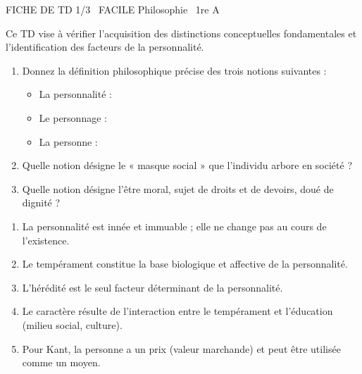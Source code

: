\documentclass[11pt]{article}
\begin{document}
\begin{tcolorbox}[enhanced,colback=popink,colframe=popink,arc=10pt,boxrule=0pt,left=12pt,right=12pt,top=9pt,bottom=9pt]
{\color{white}\popxbold\small FICHE DE TD 1/3 \textbullet\ FACILE \hfill Philosophie \textbullet\ 1re A\par}
\end{tcolorbox}
\vspace{4pt}
Ce TD vise à vérifier l'acquisition des distinctions conceptuelles fondamentales et l'identification des facteurs de la personnalité.

\begin{exercice}
\begin{enumerate}
    \item Donnez la définition philosophique précise des trois notions suivantes :
    \begin{itemize}
        \item La personnalité :
        \item Le personnage :
        \item La personne :
    \end{itemize}
    \item Quelle notion désigne le « masque social » que l'individu arbore en société ?
    \item Quelle notion désigne l'être moral, sujet de droits et de devoirs, doué de dignité ?
\end{enumerate}
\end{exercice}

\begin{exercice}
\begin{enumerate}
    \item La personnalité est innée et immuable ; elle ne change pas au cours de l'existence.
    \item Le tempérament constitue la base biologique et affective de la personnalité.
    \item L'hérédité est le seul facteur déterminant de la personnalité.
    \item Le caractère résulte de l'interaction entre le tempérament et l'éducation (milieu social, culture).
    \item Pour Kant, la personne a un prix (valeur marchande) et peut être utilisée comme un moyen.
\end{enumerate}
\end{exercice}
\end{document}
